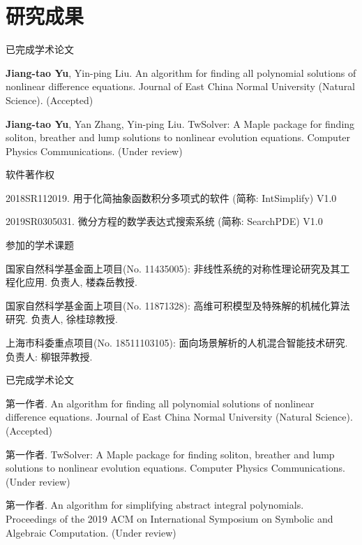 \chapter*{研究成果}

\ifdefined\RELESE %

\noindent 已完成学术论文
\begin{enumerate}[label={[\arabic*]},leftmargin=*]
\item {\bf Jiang-tao Yu}, Yin-ping Liu. An algorithm for finding all polynomial
solutions of nonlinear difference equations. Journal of East China Normal University (Natural Science). (Accepted)
\item {\bf Jiang-tao Yu}, Yan Zhang, Yin-ping Liu. TwSolver: A Maple package for finding soliton, breather and lump solutions to nonlinear evolution equations. Computer Physics Communications. (Under review)
\end{enumerate}

\noindent 软件著作权
\begin{enumerate}[label={[\arabic*]},leftmargin=*]
\item 2018SR112019. 用于化简抽象函数积分多项式的软件 (简称: IntSimplify) V1.0
\item 2019SR0305031. 微分方程的数学表达式搜索系统 (简称: SearchPDE) V1.0
\end{enumerate}

\noindent 参加的学术课题
\begin{enumerate}[label={[\arabic*]},leftmargin=*]
\item 国家自然科学基金面上项目(No. 11435005): 非线性系统的对称性理论研究及其工程化应用. 负责人, 楼森岳教授.
\item 国家自然科学基金面上项目(No. 11871328): 高维可积模型及特殊解的机械化算法研究. 负责人, 徐桂琼教授.
\item 上海市科委重点项目(No. 18511103105): 面向场景解析的人机混合智能技术研究. 负责人: 柳银萍教授.
\end{enumerate}

\else %

\noindent 已完成学术论文
\begin{enumerate}[label={[\arabic*]},leftmargin=*]
\item 第一作者. An algorithm for finding all polynomial
solutions of nonlinear difference equations. Journal of East China Normal University (Natural Science). (Accepted)
\item 第一作者. TwSolver: A Maple package for finding soliton, breather and lump solutions to nonlinear evolution equations. Computer Physics Communications. (Under review)
\item 第一作者.  An algorithm for simplifying abstract integral polynomials. Proceedings of the 2019 ACM on International Symposium on Symbolic and Algebraic Computation. (Under review)
\end{enumerate}

